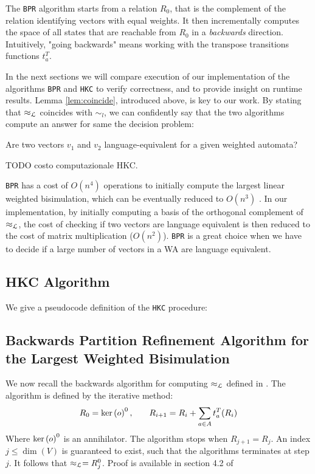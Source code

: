 The \texttt{BPR} algorithm starts from a relation $R_0$, that is the complement 
of the relation identifying vectors with equal weights.
It then incrementally computes the space of all states that are reachable from 
$R_0$ in a \textit{backwards} direction. Intuitively, "going backwards" means 
working with the transpose transitions functions $t_a^T$.

In the next sections we will compare execution of our implementation of the algorithms
\texttt{BPR} and \texttt{HKC} to verify correctness,
and to provide insight on runtime results.
Lemma \ref{lem:coincide}, introduced above, is key to our work. By stating that 
$\approx_{\mathcal{L}}$ coincides with $\sim_l$, we can confidently say that the two algorithms 
compute an answer for same the decision problem:

\begin{center}
    Are two vectors $v_1$ and $v_2$ language-equivalent for a given weighted automata? 
\end{center}

TODO costo computazionale HKC.

\texttt{BPR} has a cost of $O(n^4)$ operations 
to initially compute the largest linear weighted bisimulation,
which can be eventually reduced to $O(n^3)$ \cite{BONCHI201277}.
In our implementation, by initially computing a basis of the orthogonal complement of $\approx_{\mathcal{L}}$,
the cost of checking if two vectors are language equivalent is then reduced to the
cost of matrix multiplication ($O(n^2)$). \texttt{BPR} is a great choice when we
have to decide if a large number of vectors in a WA are language equivalent.


\subsection{HKC Algorithm}
We give a pseudocode definition of the \texttt{HKC} procedure:


\label{fig:hkc}

\subsection{Backwards Partition Refinement Algorithm for the Largest Weighted Bisimulation}
\label{sec:algo2}

We now recall the backwards algorithm for computing $\approx_{\mathcal{L}}$ defined in \cite{BONCHI201277}.
The algorithm is defined by the iterative method:
\begin{eqnarray}
  R_0 = \text{ker}\left(o\right)^0, & \quad & R_{i+1} = R_i + \sum_{a \in A} t_a^T(R_i) \label{back} 
\end{eqnarray}
Where $\text{ker}\left(o\right)^0$ is an annihilator.
The algorithm stops when $R_{j+1} = R_j$. An index $j \leq \dim(V)$ is 
guaranteed to exist, such that the algorithms terminates at step $j$.
It follows that $\approx_{\mathcal{L}} = R_j^0$.
Proof is available in section 4.2 of \cite{BONCHI201277}

